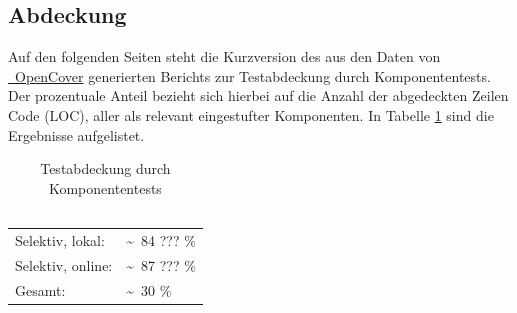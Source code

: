 %






\subsection{Abdeckung}
\label{Abschnitt:Tests:Statistik:Abdeckung}

\newcommand\VSLocalCoverage{\textasciitilde~84 ??? \%}

\newcommand\OnlineLocalCoverage{\textasciitilde~87 ??? \%}

\newcommand\VSGlobalCoverage{\textasciitilde~30 \%}

Auf den folgenden Seiten steht die Kurzversion des aus den Daten von \hyperref[Abschnitt:Tests:Werkzeuge:Automatisiert:OpenCover]{\mousecursor~OpenCover} generierten Berichts zur Testabdeckung durch Komponententests.
Der prozentuale Anteil bezieht sich hierbei auf die Anzahl der abgedeckten Zeilen Code (LOC), aller als relevant eingestufter Komponenten. In Tabelle \ref{Abschnitt:Tests:Statistik:Abdeckung:Tabelle} sind die Ergebnisse aufgelistet.

\begin{longtable}{p{0.5\hsize}p{0.5\hsize}}

	\caption{Testabdeckung durch Komponententests\\~\\}
	\label{Abschnitt:Tests:Statistik:Abdeckung:Tabelle}
	\\

	  Selektiv, lokal:
	& \VSLocalCoverage \\
	
	  Selektiv, online:
	& \OnlineLocalCoverage \\
	
	  Gesamt:
	& \VSGlobalCoverage \\

\end{longtable}

~\\

